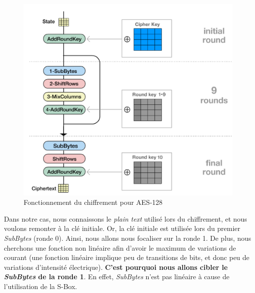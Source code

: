 \documentclass[a4paper, 12pt]{article}
\begin{document}
		\begin{figure}[H]
			\begin{center}
			\includegraphics[scale=0.7]{images/AES_principe.png}
			\end{center}
			\caption{Fonctionnement du chiffrement pour AES-128}
			\label{AES_principe}
		\end{figure}

Dans notre cas, nous connaissons le \emph{plain text} utilisé lors du chiffrement, et nous voulons remonter à la clé initiale. Or, la clé initiale est utilisée lors du premier \emph{SubBytes} (ronde 0). Ainsi, nous allons nous focaliser sur la ronde 1. 
De plus, nous cherchons une fonction non linéaire afin d'avoir le maximum de variations de courant (une fonction linéaire implique peu de transitions de bits, et donc peu de variations d'intensité électrique). \textbf{C'est pourquoi nous allons cibler le \emph{SubBytes} de la ronde 1}. En effet, \emph{SubBytes} n'est pas linéaire à cause de l'utilisation de la S-Box.
\end{document}
